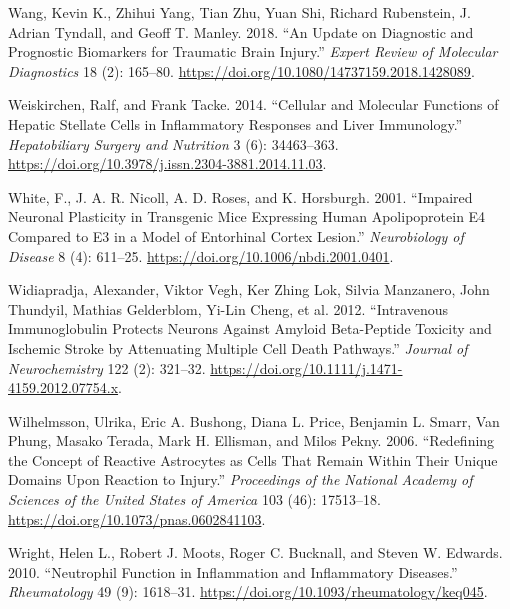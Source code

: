 \documentclass[9pt,lineno]{elife}
\newlength{\cslhangindent}
\newlength{\cslentryspacingunit} %
\newenvironment{CSLReferences}[2] %
 {%
  \setlength{\parindent}{0pt}
  \ifodd #1
  \let\oldpar\par
  \def\par{\hangindent=\cslhangindent\oldpar}
  \fi
  \setlength{\parskip}{#2\cslentryspacingunit}
 }%
 {}
\begin{document}
\begin{CSLReferences}{1}{0}
\leavevmode{}%
Wang, Kevin K., Zhihui Yang, Tian Zhu, Yuan Shi, Richard Rubenstein, J. Adrian Tyndall, and Geoff T. Manley. 2018. {``An Update on Diagnostic and Prognostic Biomarkers for Traumatic Brain Injury.''} \emph{Expert Review of Molecular Diagnostics} 18 (2): 165--80. \url{https://doi.org/10.1080/14737159.2018.1428089}.

\leavevmode{}%
Weiskirchen, Ralf, and Frank Tacke. 2014. {``Cellular and Molecular Functions of Hepatic Stellate Cells in Inflammatory Responses and Liver Immunology.''} \emph{Hepatobiliary Surgery and Nutrition} 3 (6): 34463--363. \url{https://doi.org/10.3978/j.issn.2304-3881.2014.11.03}.

\leavevmode{}%
White, F., J. A. R. Nicoll, A. D. Roses, and K. Horsburgh. 2001. {``Impaired {Neuronal Plasticity} in {Transgenic Mice Expressing Human Apolipoprotein E4 Compared} to {E3} in a {Model} of {Entorhinal Cortex Lesion}.''} \emph{Neurobiology of Disease} 8 (4): 611--25. \url{https://doi.org/10.1006/nbdi.2001.0401}.

\leavevmode{}%
Widiapradja, Alexander, Viktor Vegh, Ker Zhing Lok, Silvia Manzanero, John Thundyil, Mathias Gelderblom, Yi-Lin Cheng, et al. 2012. {``Intravenous Immunoglobulin Protects Neurons Against Amyloid Beta-Peptide Toxicity and Ischemic Stroke by Attenuating Multiple Cell Death Pathways.''} \emph{Journal of Neurochemistry} 122 (2): 321--32. \url{https://doi.org/10.1111/j.1471-4159.2012.07754.x}.

\leavevmode{}%
Wilhelmsson, Ulrika, Eric A. Bushong, Diana L. Price, Benjamin L. Smarr, Van Phung, Masako Terada, Mark H. Ellisman, and Milos Pekny. 2006. {``Redefining the Concept of Reactive Astrocytes as Cells That Remain Within Their Unique Domains Upon Reaction to Injury.''} \emph{Proceedings of the National Academy of Sciences of the United States of America} 103 (46): 17513--18. \url{https://doi.org/10.1073/pnas.0602841103}.

\leavevmode{}%
Wright, Helen L., Robert J. Moots, Roger C. Bucknall, and Steven W. Edwards. 2010. {``Neutrophil Function in Inflammation and Inflammatory Diseases.''} \emph{Rheumatology} 49 (9): 1618--31. \url{https://doi.org/10.1093/rheumatology/keq045}.


\end{CSLReferences}
\end{document}

